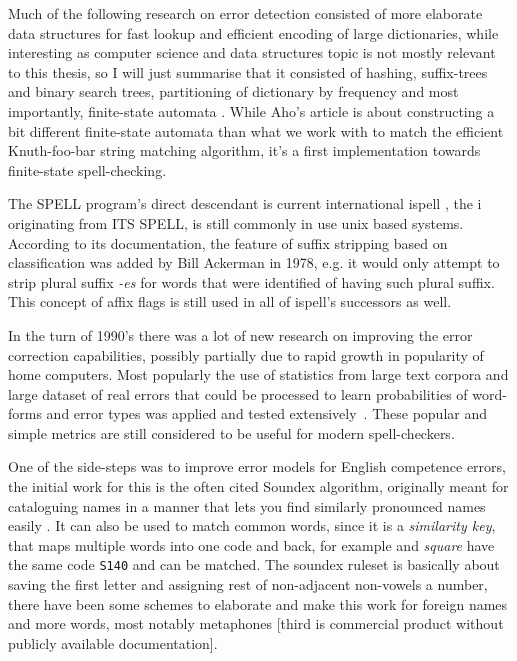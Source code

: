 \documentclass[officiallayout,draft]{unihelcompling}
\newcommand\misspelt{\bgroup\markoverwith
{\textcolor{red}{\lower3.5pt\hbox{\sixly \char58}}}\ULon}
\begin{document}
Much of the following research on error detection consisted of more elaborate
data structures for fast lookup and efficient encoding of large dictionaries,
while interesting as computer science and data structures topic is not mostly
relevant to this thesis, so I will just summarise that it consisted of hashing,
suffix-trees and binary search trees, partitioning of dictionary by frequency
\cite{knuth1973art} and most importantly, finite-state automata
\cite{aho1975efficient}. While Aho's article is about constructing a bit
different finite-state automata than what we work with to match the
efficient Knuth-foo-bar string matching algorithm, it's
a first implementation towards finite-state spell-checking.

The SPELL program's direct descendant is current international ispell
\cite{gorin1971spell}, the i originating from ITS SPELL, is still commonly in
use unix based systems. According to its documentation, the feature of suffix
stripping based on classification was added by Bill Ackerman in 1978, e.g. it
would only attempt to strip plural suffix \emph{-es} for words that were
identified of having such plural suffix.  This concept of affix flags is still
used in all of ispell's successors as well.

In the turn of 1990's there was a lot of new research on improving the error
correction capabilities, possibly partially due to rapid growth in popularity
of home computers. Most popularly the use of statistics from large text corpora
and large dataset of real errors that could be processed to learn probabilities
of word-forms and error types was applied and tested
extensively~\cite{kernighan1990spelling,church1991probability}. These popular
and simple metrics are still considered to be useful for modern spell-checkers.

One of the side-steps was to improve error models for English competence
errors, the initial work for this is the often cited Soundex algorithm,
originally meant for cataloguing names in a manner that lets you find similarly
pronounced names easily \cite{russell1918soundex}. It can also be used to match
common words, since it is a \emph{similarity key}, that maps multiple words
into one code and back, for example \misspelt{squer} and \emph{square} have the
same code \texttt{S140} and can be matched. The soundex ruleset is basically
about saving the first letter and assigning rest of non-adjacent non-vowels a
number, there have been some schemes to elaborate and make this work for
foreign names and more words, most notably metaphones
\cite{philips1990hanging,philips2000double}[third is commercial product without
publicly available documentation].
\end{document}
